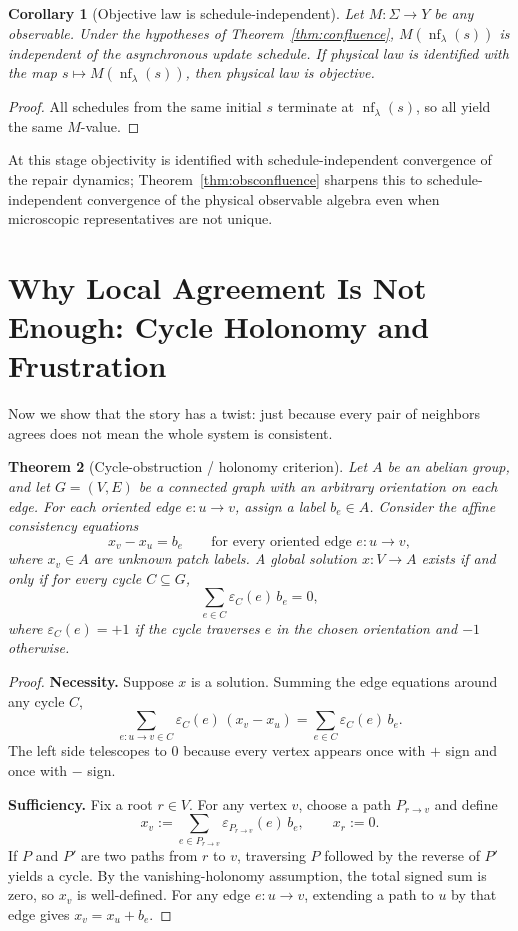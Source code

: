 \documentclass[11pt]{article}
\newtheorem{theorem}{Theorem}[section]
\newtheorem{corollary}[theorem]{Corollary}
\theoremstyle{remark}
\theoremstyle{plain}
\begin{document}
\begin{corollary}[Objective law is schedule-independent]\label{cor:objective}
Let $M:\Sigma\to Y$ be any observable. Under the hypotheses of Theorem~\ref{thm:confluence}, $M(\operatorname{nf}_\lambda(s))$ is independent of the asynchronous update schedule. If physical law is identified with the map $s\mapsto M(\operatorname{nf}_\lambda(s))$, then physical law is objective.
\end{corollary}

\begin{proof}
All schedules from the same initial $s$ terminate at $\operatorname{nf}_\lambda(s)$, so all yield the same $M$-value.
\end{proof}

At this stage objectivity is identified with schedule-independent convergence of the repair
dynamics; Theorem~\ref{thm:obsconfluence} sharpens this to schedule-independent convergence of the
physical observable algebra even when microscopic representatives are not unique.


\section{Why Local Agreement Is Not Enough: Cycle Holonomy and Frustration}

Now we show that the story has a twist: just because every pair of neighbors agrees does not mean the whole system is consistent.

\begin{theorem}[Cycle-obstruction / holonomy criterion]\label{thm:holonomy}
Let $A$ be an abelian group, and let $G=(V,E)$ be a connected graph with an arbitrary orientation on each edge. For each oriented edge $e:u\to v$, assign a label $b_e\in A$. Consider the affine consistency equations
\[
x_v - x_u = b_e
\qquad
\text{for every oriented edge } e:u\to v,
\]
where $x_v\in A$ are unknown patch labels. A global solution $x:V\to A$ exists if and only if for every cycle $C\subseteq G$,
\[
\sum_{e\in C}\varepsilon_C(e)\, b_e = 0,
\]
where $\varepsilon_C(e)=+1$ if the cycle traverses $e$ in the chosen orientation and $-1$ otherwise.
\end{theorem}

\begin{proof}
\textbf{Necessity.} Suppose $x$ is a solution. Summing the edge equations around any cycle $C$,
\[
\sum_{e:u\to v\in C}\varepsilon_C(e)\,(x_v-x_u)
=
\sum_{e\in C}\varepsilon_C(e)\,b_e.
\]
The left side telescopes to $0$ because every vertex appears once with $+$ sign and once with $-$ sign.

\textbf{Sufficiency.} Fix a root $r\in V$. For any vertex $v$, choose a path $P_{r\to v}$ and define
\[
x_v := \sum_{e\in P_{r\to v}} \varepsilon_{P_{r\to v}}(e)\, b_e,
\qquad x_r:=0.
\]
If $P$ and $P'$ are two paths from $r$ to $v$, traversing $P$ followed by the reverse of $P'$ yields a cycle. By the vanishing-holonomy assumption, the total signed sum is zero, so $x_v$ is well-defined. For any edge $e:u\to v$, extending a path to $u$ by that edge gives $x_v = x_u + b_e$.
\end{proof}
\end{document}
